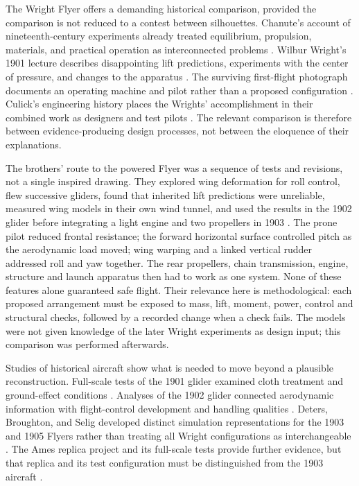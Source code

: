 \documentclass[11pt,a4paper]{article}
\begin{document}
The Wright Flyer offers a demanding historical comparison, provided the comparison is not reduced to a contest between silhouettes. Chanute's account of nineteenth-century experiments already treated equilibrium, propulsion, materials, and practical operation as interconnected problems \cite{ref1}. Wilbur Wright's 1901 lecture describes disappointing lift predictions, experiments with the center of pressure, and changes to the apparatus \cite{ref2}. The surviving first-flight photograph documents an operating machine and pilot rather than a proposed configuration \cite{ref4}. Culick's engineering history places the Wrights' accomplishment in their combined work as designers and test pilots \cite{ref5}. The relevant comparison is therefore between evidence-producing design processes, not between the eloquence of their explanations.

The brothers' route to the powered Flyer was a sequence of tests and revisions, not a single inspired drawing. They explored wing deformation for roll control, flew successive gliders, found that inherited lift predictions were unreliable, measured wing models in their own wind tunnel, and used the results in the 1902 glider before integrating a light engine and two propellers in 1903 \cite{ref2,ref35}. The prone pilot reduced frontal resistance; the forward horizontal surface controlled pitch as the aerodynamic load moved; wing warping and a linked vertical rudder addressed roll and yaw together. The rear propellers, chain transmission, engine, structure and launch apparatus then had to work as one system. None of these features alone guaranteed safe flight. Their relevance here is methodological: each proposed arrangement must be exposed to mass, lift, moment, power, control and structural checks, followed by a recorded change when a check fails. The models were not given knowledge of the later Wright experiments as design input; this comparison was performed afterwards.

Studies of historical aircraft show what is needed to move beyond a plausible reconstruction. Full-scale tests of the 1901 glider examined cloth treatment and ground-effect conditions \cite{ref8}. Analyses of the 1902 glider connected aerodynamic information with flight-control development and handling qualities \cite{ref7,ref9}. Deters, Broughton, and Selig developed distinct simulation representations for the 1903 and 1905 Flyers rather than treating all Wright configurations as interchangeable \cite{ref11}. The Ames replica project and its full-scale tests provide further evidence, but that replica and its test configuration must be distinguished from the 1903 aircraft \cite{ref12,ref13}.
\end{document}
